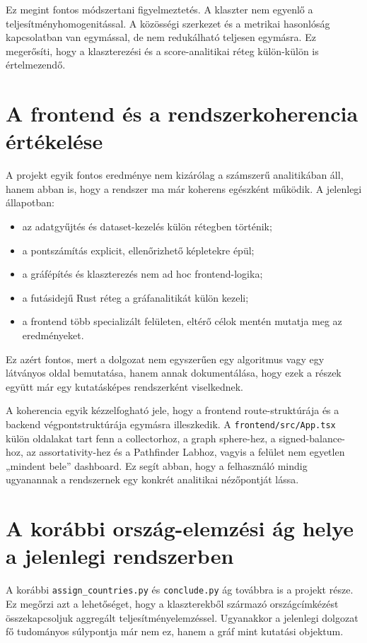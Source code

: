 \documentclass[a4paper,12pt]{report}
\begin{document}
Ez megint fontos módszertani figyelmeztetés. A klaszter nem egyenlő a teljesítményhomogenitással. A közösségi szerkezet és a metrikai hasonlóság kapcsolatban van egymással, de nem redukálható teljesen egymásra. Ez megerősíti, hogy a klaszterezési és a score-analitikai réteg külön-külön is értelmezendő.

\section{A frontend és a rendszerkoherencia értékelése}

A projekt egyik fontos eredménye nem kizárólag a számszerű analitikában áll, hanem abban is, hogy a rendszer ma már koherens egészként működik. A jelenlegi állapotban:

\begin{itemize}
    \item az adatgyűjtés és dataset-kezelés külön rétegben történik;
    \item a pontszámítás explicit, ellenőrizhető képletekre épül;
    \item a gráfépítés és klaszterezés nem ad hoc frontend-logika;
    \item a futásidejű Rust réteg a gráfanalitikát külön kezeli;
    \item a frontend több specializált felületen, eltérő célok mentén mutatja meg az eredményeket.
\end{itemize}

Ez azért fontos, mert a dolgozat nem egyszerűen egy algoritmus vagy egy látványos oldal bemutatása, hanem annak dokumentálása, hogy ezek a részek együtt már egy kutatásképes rendszerként viselkednek.

A koherencia egyik kézzelfogható jele, hogy a frontend route-struktúrája és a backend végpontstruktúrája egymásra illeszkedik. A \texttt{frontend/src/App.tsx} külön oldalakat tart fenn a collectorhoz, a graph sphere-hez, a signed-balance-hoz, az assortativity-hez és a Pathfinder Labhoz, vagyis a felület nem egyetlen „mindent bele” dashboard. Ez segít abban, hogy a felhasználó mindig ugyanannak a rendszernek egy konkrét analitikai nézőpontját lássa.

\section{A korábbi ország-elemzési ág helye a jelenlegi rendszerben}

A korábbi \texttt{assign\_countries.py} és \texttt{conclude.py} ág továbbra is a projekt része. Ez megőrzi azt a lehetőséget, hogy a klaszterekből származó országcímkézést összekapcsoljuk aggregált teljesítményelemzéssel. Ugyanakkor a jelenlegi dolgozat fő tudományos súlypontja már nem ez, hanem a gráf mint kutatási objektum.
\end{document}
